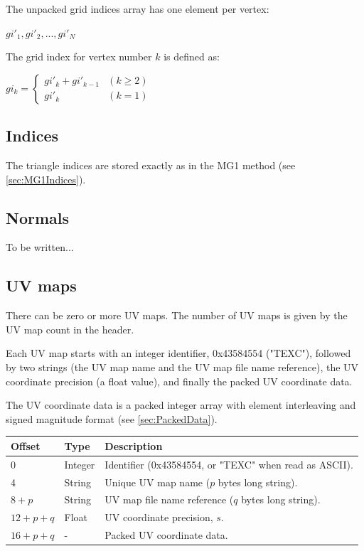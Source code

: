 The unpacked grid indices array has one element per vertex:

$gi'_1, gi'_2, ..., gi'_N$

The grid index for vertex number $k$ is defined as:

$gi_k = \begin{cases}
gi'_k + gi'_{k-1} & (k \geq 2)\\
gi'_k & (k = 1)
\end{cases}$

\subsection{Indices}
The triangle indices are stored exactly as in the MG1 method (see \ref{sec:MG1Indices}).

\subsection{Normals}
To be written...

\subsection{UV maps}
There can be zero or more UV maps. The number of UV maps is given by the
UV map count in the header.

Each UV map starts with an integer identifier, 0x43584554 ("TEXC"), followed
by two strings (the UV map name and the UV map file name reference), the
UV coordinate precision (a float value), and finally the packed UV coordinate data.

The UV coordinate data is a packed integer array with element interleaving
and signed magnitude format (see \ref{sec:PackedData}).

\begin{tabular}{|l|l|l|}\hline
\textbf{Offset} &  \textbf{Type} & \textbf{Description}\\ \hline
0 & Integer & Identifier (0x43584554, or "TEXC" when read as ASCII).\\ \hline
4 & String & Unique UV map name ($p$ bytes long string).\\ \hline
$8+p$ & String & UV map file name reference ($q$ bytes long string).\\ \hline
$12+p+q$ & Float & UV coordinate precision, $s$.\\ \hline
$16+p+q$ & - & Packed UV coordinate data.\\ \hline
\end{tabular}

